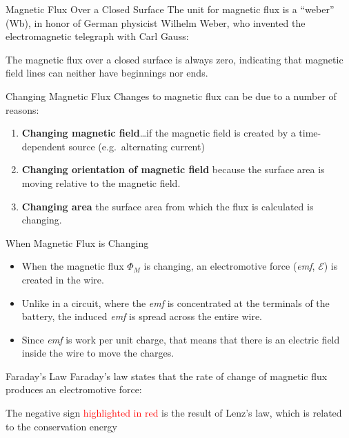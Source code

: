 \documentclass[12pt,aspectratio=169]{beamer}
\newcommand{\eq}[2]{\vspace{#1}{\Large\begin{displaymath}#2\end{displaymath}}}
\begin{document}
\begin{frame}{Magnetic Flux Over a Closed Surface}
  The unit for magnetic flux is a ``weber'' (\si{\weber}), in honor of German
  physicist Wilhelm Weber, who invented the electromagnetic telegraph with Carl
  Gauss:

  \eq{-.3in}{
    \SI1{\weber}=\SI1{\tesla\metre\squared}
  }
  
  The magnetic flux over a closed surface is always zero,
  indicating that magnetic field lines can neither have beginnings nor ends.

  \eq{-.2in}{
    \oint\bm{B}\cdot d\bm{A}=0
  }
\end{frame}


\begin{frame}{Changing Magnetic Flux}
  Changes to magnetic flux can be due to a number of reasons:
  \begin{enumerate}
  \item\textbf{Changing magnetic field}\ldots if the magnetic field is created
    by a time-dependent source (e.g.\ alternating current)
  \item\textbf{Changing orientation of magnetic field} because the
    surface area is moving relative to the magnetic field.
  \item\textbf{Changing area} the surface area from which the flux is
    calculated is changing.
  \end{enumerate}
\end{frame}



\begin{frame}{When Magnetic Flux is Changing}
  \begin{itemize}
  \item When the magnetic flux $\Phi_M$ is changing, an electromotive force
    (\emph{emf}, $\mathcal{E}$) is created in the wire.
  \item Unlike in a circuit, where the \emph{emf} is concentrated at the
    terminals of the battery, the induced \emph{emf} is spread across the
    entire wire.
    \item Since \emph{emf} is work per unit charge, that means that there is an
      electric field inside the wire to move the charges.
    \end{itemize}
\end{frame}


\begin{frame}{Faraday's Law}
  Faraday's law states that the rate of change of magnetic flux produces an
  electromotive force:

  \eq{-.2in}{
    \boxed{
      \overline{\mathcal{E}}={\color{red}{-}}\frac{\Delta\Phi_M}{\Delta t}
    }
  }
  
  The negative sign {\textcolor{red}{highlighted in red}} is the result of
  Lenz's law, which is related to the conservation energy
\end{frame}
\end{document}
